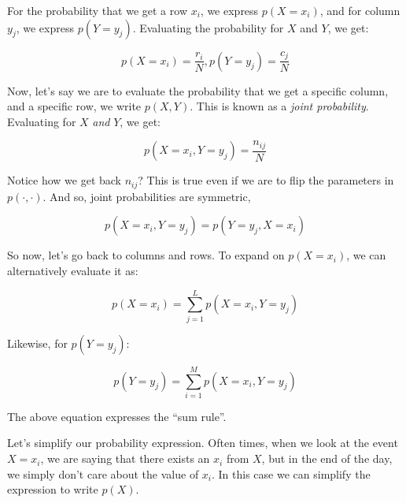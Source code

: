 \documentclass{tufte-handout}
\begin{document}
For the probability that we get a row $x_i$, we express $p(X = x_i)$, and for
column $y_j$, we express $p(Y = y_j)$. Evaluating the probability for $X$ and
$Y$, we get:

\begin{equation} \label{equation:probbasic}
  p(X = x_i) = \frac{r_i}{N}, p(Y = y_j) = \frac{c_j}{N}
\end{equation}


Now, let's say we are to evaluate the probability that we get a specific column,
and a specific row, we write $p(X, Y)$. This is known as a \emph{joint
probability}. Evaluating for $X$ \emph{and} $Y$, we get:

\begin{equation} \label{equation:jointprob}
  p(X = x_i, Y = y_j) = \frac{n_{ij}}{N}
\end{equation}

Notice how we get back $n_{ij}$? This is true even if we are to flip the
parameters in $p(\cdot, \cdot)$. And so, joint probabilities are symmetric,

\begin{equation}\label{equation:probabilitysymmetry}
  p(X = x_i, Y = y_j) = p(Y = y_j, X = x_i)
\end{equation}

So now, let's go back to columns and rows. To expand on $p(X = x_i)$, we can
alternatively evaluate it as:

\begin{equation}
  p(X = x_i) = \sum\limits_{j = 1}^Lp(X = x_i, Y = y_j)
\end{equation}

Likewise, for $p(Y = y_j)$:

\begin{equation}
  p(Y = y_j) = \sum\limits_{i = 1}^Mp(X = x_i, Y = y_j)
\end{equation}


The above equation expresses the ``sum rule''.

Let's simplify our probability expression. Often times, when we look at the
event $X = x_i$, we are saying that there exists an $x_i$ from $X$, but in the
end of the day, we simply don't care about the value of $x_i$. In this case we
can simplify the expression to write $p(X)$.
\end{document}
